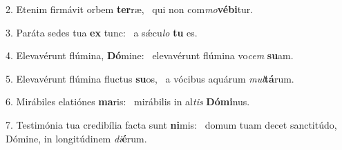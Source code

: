 2. Etenim firmávit orbem \textbf{ter}ræ, \ast\  qui non com\textit{mo}\textbf{vé}\textbf{bi}tur.\

3. Paráta sedes tua \textbf{ex} tunc: \ast\  a sǽcu\textit{lo} \textbf{tu} es.\

4. Elevavérunt flúmina, \textbf{Dó}mine: \ast\  elevavérunt flúmina vo\textit{cem} \textbf{su}am.\

5. Elevavérunt flúmina fluctus \textbf{su}os, \ast\  a vócibus aquárum \textit{mul}\textbf{tá}rum.\

6. Mirábiles elatiónes \textbf{ma}ris: \ast\  mirábilis in al\textit{tis} \textbf{Dó}\textbf{mi}nus.\

7. Testimónia tua credibília facta sunt \textbf{ni}mis: \ast\  domum tuam decet sanctitúdo, Dómine, in longitúdinem \textit{di}\textbf{é}rum.\

